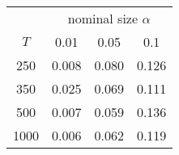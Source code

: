 % 
\begin{tabular}{cccc}
  \hline
  & \multicolumn{3}{c}{nominal size $\alpha$} \\
 $T$ & 0.01 & 0.05 & 0.1 \\
 \hline
250 & 0.008 & 0.080 & 0.126 \\ 
  350 & 0.025 & 0.069 & 0.111 \\ 
  500 & 0.007 & 0.059 & 0.136 \\ 
  1000 & 0.006 & 0.062 & 0.119 \\ 
   \hline
\end{tabular}
